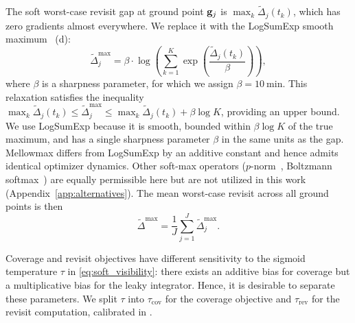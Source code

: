 The soft worst-case revisit gap at ground point $\mathbf{g}_j$ is $\max_k \tilde{\Delta}_j(t_k)$, which has zero gradients almost everywhere.
We replace it with the LogSumExp smooth maximum~\citep{boyd_convex_2023} (d):
\begin{equation}
    \widetilde{\Delta}_j^{\max} = \beta \cdot \log\!\left(\sum_{k=1}^{K} \exp\!\left(\frac{\tilde{\Delta}_j(t_k)}{\beta}\right)\right),
    \label{eq:logsumexp}
\end{equation}
where $\beta$ is a sharpness parameter, for which we assign $\beta = \SI{10}{\minute}$.
This relaxation satisfies the inequality $\max_k \tilde{\Delta}_j(t_k) \leq \widetilde{\Delta}_j^{\max} \leq \max_k \tilde{\Delta}_j(t_k) + \beta \log K$, providing an upper bound.
We use LogSumExp because it is smooth, bounded within $\beta \log K$ of the true maximum, and has a single sharpness parameter $\beta$ in the same units as the gap. Mellowmax differs from LogSumExp by an additive constant and hence admits identical optimizer dynamics. Other soft-max operators ($p$-norm~\citep{boyd_convex_2023}, Boltzmann softmax~\citep{asadi_alternative_2017}) are equally permissible here but are not utilized in this work (Appendix~\ref{app:alternatives}).
The mean worst-case revisit across all ground points is then
\begin{equation}
    \tilde{\Delta}^{\max} = \frac{1}{J} \sum_{j=1}^{J} \widetilde{\Delta}_j^{\max}.
    \label{eq:mean_revisit}
\end{equation}

Coverage and revisit objectives have different sensitivity to the sigmoid temperature $\tau$ in \eqref{eq:soft_visibility}: there exists an additive bias for coverage but a multiplicative bias for the leaky integrator. Hence, it is desirable to separate these parameters. We split $\tau$ into $\tau_{\text{cov}}$ for the coverage objective and $\tau_{\text{rev}}$ for the revisit computation, calibrated in .

